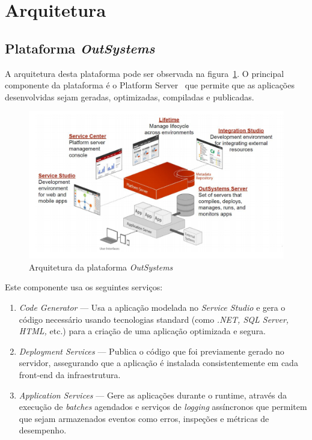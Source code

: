 \newpage

\section{Arquitetura}\label{sec:arquitechture}

\subsection{Plataforma \textit{OutSystems}}\label{sec:OutSystemsArch}

A arquitetura desta plataforma pode ser observada na figura~\ref{fig:outsystemsArch}. 
O principal componente da plataforma é o Platform Server~\cite{outsystemsPlatformServer} que permite que as aplicações 
desenvolvidas sejam geradas, optimizadas, compiladas e publicadas. 

\begin{figure}[H]
  \centering
  \includegraphics[]{figures/Architecture.png}
  \caption{Arquitetura da plataforma \textit{OutSystems~\cite{outsystems}}}\label{fig:outsystemsArch}
\end{figure}

Este componente usa os seguintes serviços: 
\begin{enumerate}
  \item \textit{Code Generator} --- Usa a aplicação modelada no \textit{Service Studio} e gera o código necessário usando tecnologias standard (como \textit{.NET, SQL Server, HTML,} etc.) para a criação de uma aplicação optimizada e segura.
  \item \textit{Deployment Services} --- Publica o código que foi previamente gerado no servidor, assegurando que a aplicação é instalada consistentemente em cada front-end da infraestrutura.
  \item \textit{Application Services} --- Gere as aplicações durante o runtime, através da execução de \textit{batches} agendados e serviços de \textit{logging} assíncronos que permitem que sejam armazenados eventos como erros, inspeções e métricas de desempenho.
\end{enumerate}

